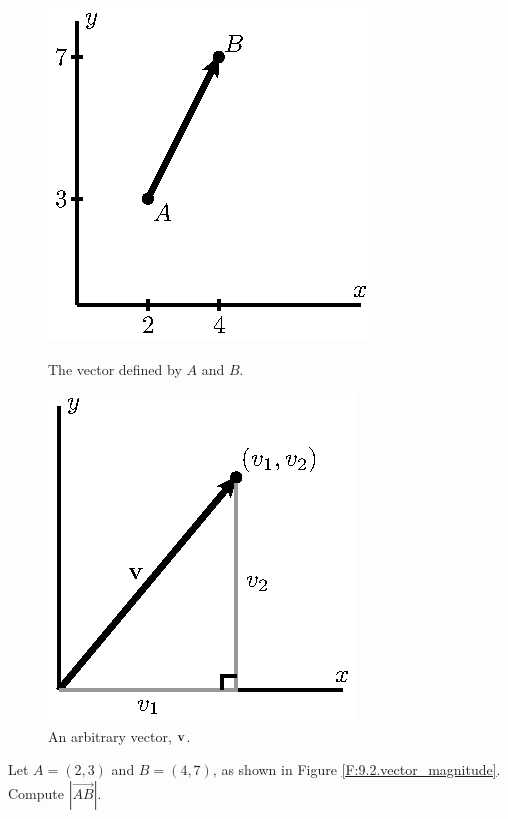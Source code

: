 \begin{activity} \label{A:9.2.7}

\begin{figure}[h]
\begin{center}
\begin{minipage}{3in}
\begin{center}
\includegraphics{figures/fig-9-20.eps}
\end{center}
\caption{The vector defined by $A$ and $B$.} %
\label{F:9.2.vector_magnitude}
\end{minipage}
\begin{minipage}{3in}
\begin{center}
\includegraphics{figures/fig-9-21.eps}
\end{center}
\caption{An arbitrary vector, $\mathbf{v}$.}
\label{F:9.2.vector_magnitude2}
\end{minipage}
\end{center}
\end{figure}
	\ba
	\item Let $A = (2,3)$ and $B = (4,7)$, as shown in Figure \ref{F:9.2.vector_magnitude}. Compute $|\overrightarrow{AB}|$.



\end{activity}
